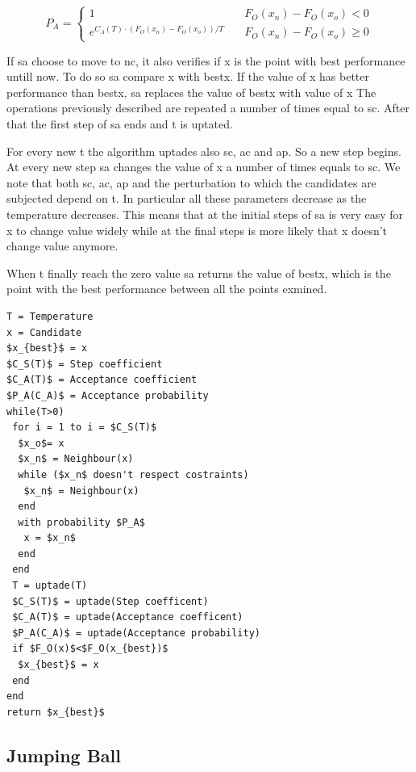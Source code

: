 \documentclass[journal]{IEEEtran}
\begin{document}
 \begin{equation}
 	\label{accept_prob}
	P_A = \begin{cases}
		1 & \quad F_O (x_n)-F_O (x_o) < 0 \\
		e^{ C_A(T)  \cdot(F_O (x_n)-F_O (x_o))/T } & \quad F_O (x_n)-F_O(x_o) \geq 0
\end{cases}
 \end{equation}

If \gls{sa} choose to move to \gls{nc}, it also verifies if \gls{x} is the point with best performance untill now. To do so \gls{sa} compare \gls{x} with \gls{bestx}. If the value of \gls{x} has better performance than \gls{bestx}, \gls{sa} replaces the value of \gls{bestx} with value of \gls{x} The operations previously described are repeated a number of times equal to \gls{sc}. After that the first step of \gls{sa} ends and \gls{t} is uptated.

For every new \gls{t} the algorithm uptades also \gls{sc}, \gls{ac} and \gls{ap}. So a new step begins. At every new step \gls{sa} changes the value of \gls{x} a number of times equals to \gls{sc}. We note that both \gls{sc}, \gls{ac}, \gls{ap} and the perturbation to which the candidates are subjected depend on \gls{t}. In particular all these parameters decrease as the temperature decreases. This means that at the initial steps of \gls{sa} is very easy for \gls{x} to change value widely while at the final steps is more likely that \gls{x} doesn't change value anymore.

When \gls{t} finally reach the zero value \gls{sa} returns the value of \gls{bestx}, which is the point with the best performance between all the points exmined.

\begin{lstlisting}[mathescape=true,frame=single]
T = Temperature
x = Candidate
$x_{best}$ = x
$C_S(T)$ = Step coefficient
$C_A(T)$ = Acceptance coefficient
$P_A(C_A)$ = Acceptance probability
while(T>0)
 for i = 1 to i = $C_S(T)$
  $x_o$= x
  $x_n$ = Neighbour(x)
  while ($x_n$ doesn't respect costraints)
   $x_n$ = Neighbour(x)
  end
  with probability $P_A$
   x = $x_n$
  end
 end
 T = uptade(T)
 $C_S(T)$ = uptade(Step coefficent)
 $C_A(T)$ = uptade(Acceptance coefficent)
 $P_A(C_A)$ = uptade(Acceptance probability)
 if $F_O(x)$<$F_O(x_{best})$
  $x_{best}$ = x
 end
end
return $x_{best}$
\end{lstlisting}  \label{code_sa}

\subsection{Jumping Ball}
\end{document}
